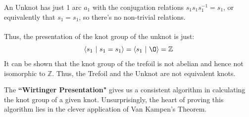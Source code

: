 \documentclass{article}
\begin{document}
\begin{example}
An Unknot has just 1 arc $a_1$ with the conjugation relations $s_1s_1s_1^{-1} = s_1$, or equivalently that $s_1 = s_1$, so there's no non-trivial relations.\\\\
Thus, the presentation of the knot group of the unknot is just:
\[\langle s_1\ |\ s_1 = s_1\rangle  = \langle s_1\ |\ \O \rangle = \mathbb{Z}\]
It can be shown that the knot group of the trefoil is not abelian and hence not isomorphic to $\mathbb{Z}$. Thus, the Trefoil and the Unknot are not equivalent knots.
\end{example}

\noindent The {\bf ``Wirtinger Presentation"} gives us a consistent algorithm in calculating the knot group of a given knot. Unsurprisingly, the heart of proving this algorithm lies in the clever application of Van Kampen's Theorem.
\end{document}
